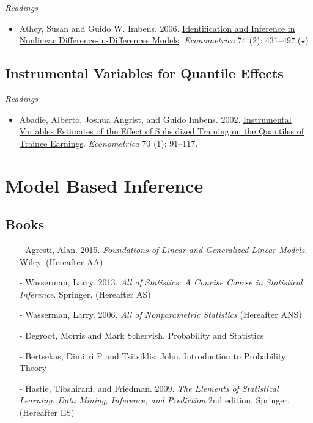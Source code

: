 \documentclass{article}
\begin{document}
\emph{Readings}
\begin{itemize}
\item Athey, Susan and Guido W. Imbens. 2006.  \href{http://www.jstor.org/stable/3598807} {Identification and Inference in Nonlinear Difference-in-Differences Models}. \textit{Econometrica} 74 (2): 431--497.($\star$)
\end{itemize}


\subsection{Instrumental Variables for Quantile Effects}
%
\emph{Readings}
\begin{itemize}
\item Abadie, Alberto, Joshua Angrist, and Guido Imbens. 2002. \href{http://www.hks.harvard.edu/fs/aabadie/qtep.pdf} {Instrumental Variables Estimates of the Effect of Subsidized Training on the Quantiles of Trainee Earnings}. \textit{Econometrica} 70 (1): 91--117.

\end{itemize}

\clearpage
\section*{Model Based Inference}
\setcounter{section}{0}

\subsection*{Books}
\begin{itemize}
\item[-] Agresti, Alan. 2015.  \emph{Foundations of Linear and Generalized Linear Models.} Wiley. (Hereafter AA)
\item[-] Wasserman, Larry. 2013.  \emph{All of Statistics: A Concise Course in Statistical Inference}. Springer. (Hereafter AS) 
\item[-] Wasserman, Larry. 2006.  \emph{All of Nonparametric Statistics} (Hereafter ANS)
\item[-] Degroot, Morris and Mark Schervish. Probability and Statistics
\item[-] Bertsekas, Dimitri P and Tsitsiklis, John.  Introduction to Probability Theory
\item[-] Hastie, Tibshirani, and Friedman.  2009.  \emph{The Elements of Statistical Learning: Data Mining, Inference, and Prediction} 2nd edition.  Springer.  (Hereafter ES)
\end{itemize}
\end{document}
